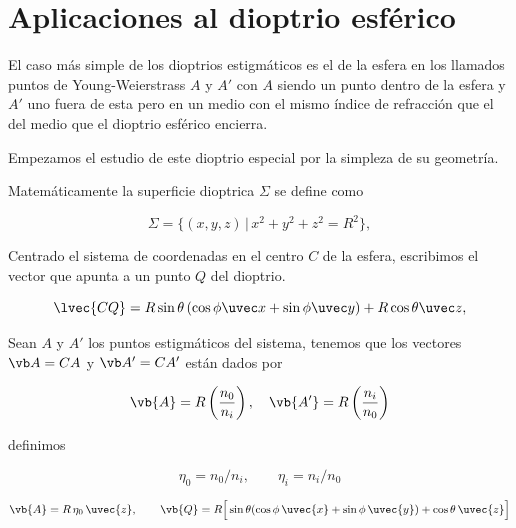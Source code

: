\chapter{Aplicaciones al dioptrio esférico}
\label{ch:esfera}

El caso más simple de los dioptrios estigmáticos es el de la esfera en los llamados puntos de Young-Weierstrass $A$ y $A'$ con $A$ siendo un punto dentro de la esfera y $A'$ uno fuera de esta pero en un medio con el mismo índice de refracción que el del medio que el dioptrio esférico encierra. 



Empezamos el estudio de este dioptrio especial por la simpleza de su geometría.

Matemáticamente la superficie dioptrica $\Sigma$ se define como

\begin{equation}
\Sigma=\{(x,y,z)\,|\,x^2+y^2+z^2=R^2\},
\label{eq:sigma_spherical}
\end{equation}

Centrado el sistema de coordenadas en el centro $C$ de la esfera, escribimos el vector que apunta a un punto $Q$ del dioptrio. 

\begin{equation}
    \lvec{CQ} = R\sin\theta \left( \cos\phi \uvec x + \sin \phi \uvec y \right)  + R\cos\theta \uvec z,
    \label{eq:CQ_def}
\end{equation}

Sean $A$ y $A'$ los puntos estigmáticos del sistema, tenemos que los vectores 
$\vb A = CA$ y $\vb A' = CA'$ están dados por %



\begin{equation}
    \vb{A} = R\left(\frac{n_0}{n_i}\right),
    \quad
    \vb{A'} = R\left(\frac{n_i}{n_0}\right)
    \label{eq:young-weierstrass}
\end{equation}

definimos

\begin{equation}
    \eta_0 = n_0/n_i, \qquad \eta_i = n_i/n_0
\end{equation}





\begin{equation}
\vb{A} = R\,\eta_0\,\uvec{z}, \qquad
\vb{Q} = R\Big[\sin\theta(\cos\phi\,\uvec{x}+\sin\phi\,\uvec{y})+\cos\theta\,\uvec{z}\Big]
\label{eq:def_A_Q}
\end{equation}

